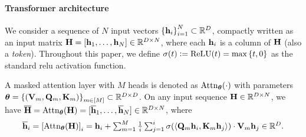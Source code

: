 \paragraph{Transformer architecture} We consider a sequence of $N$ input vectors ${\left\{ {\mathbf h}_i \right\}}_{i=1}^N\subset \mathbb{R}^D$, compactly written as an input matrix ${\mathbf H}=[{\mathbf h}_1,\dots,{\mathbf h}_N]\in \mathbb{R}^{D\times N}$, where each ${\mathbf h}_i$ is a column of ${\mathbf H}$ (also a \emph{token}). Throughout this paper, we define $\sigma(t)\mathrel{\mathop:}= \mathrm{ReLU}(t)=\max{\{ t,0 \}}$ as the standard relu activation function. %



\begin{definition}
\label{def:masked-attention}
A masked attention layer with $M$ heads is denoted as ${\rm Attn}_{{\boldsymbol \theta}}(\cdot)$ with parameters ${\boldsymbol \theta}={\{  ({\mathbf V}_m,{\mathbf Q}_m,{\mathbf K}_m) \}}_{m\in[M]}\subset \mathbb{R}^{D\times D}$. On any input sequence ${\mathbf H}\in\mathbb{R}^{D\times N}$, we have $\overline{{\mathbf H}} = {\rm Attn}_{{\boldsymbol \theta}}({\mathbf H}) = [\overline{{\mathbf h}}_1, \ldots, \overline{{\mathbf h}}_N] \in \mathbb{R}^{D \times N}$, where
\begin{align*}
\textstyle    \overline{{\mathbf h}}_i = {\left[ {\rm Attn}_{{\boldsymbol \theta}}({\mathbf H}) \right]}_i = {\mathbf h}_i + \sum_{m=1}^M \frac{1}{i}\sum_{j=1}^i \sigma{\left(  \left\langle{\mathbf Q}_m{\mathbf h}_i, {\mathbf K}_m{\mathbf h}_j\right\rangle  \right)}\cdot {\mathbf V}_m{\mathbf h}_j \in \mathbb{R}^D.
\end{align*}
\end{definition}

